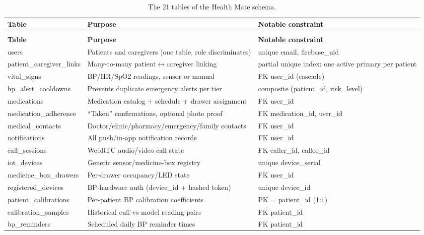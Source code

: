\documentclass[12pt,a4paper]{report}
\begin{document}
\begin{longtable}{@{}>{\raggedright\arraybackslash}p{3.4cm}>{\raggedright\arraybackslash}p{7.0cm}>{\raggedright\arraybackslash}p{4.3cm}@{}}
\caption{The 21 tables of the Health Mate schema.}\label{tab:tables}\\
\toprule
\textbf{Table} & \textbf{Purpose} & \textbf{Notable constraint} \\
\midrule
\endfirsthead
\multicolumn{3}{c}{\small\itshape Table~\ref{tab:tables} continued}\\
\toprule
\textbf{Table} & \textbf{Purpose} & \textbf{Notable constraint} \\
\midrule
\endhead
\bottomrule
\endfoot
users & Patients and caregivers (one table, role discriminates) & unique email, firebase\_uid \\
patient\_caregiver\_links & Many-to-many patient$\leftrightarrow$caregiver linking & partial unique index: one active primary per patient \\
vital\_signs & BP/HR/SpO2 readings, sensor or manual & FK user\_id (cascade) \\
bp\_alert\_cooldowns & Prevents duplicate emergency alerts per tier & composite (patient\_id, risk\_level) \\
medications & Medication catalog + schedule + drawer assignment & FK user\_id \\
medication\_adherence & ``Taken'' confirmations, optional photo proof & FK medication\_id, user\_id \\
medical\_contacts & Doctor/clinic/pharmacy/emergency/family contacts & FK user\_id \\
notifications & All push/in-app notification records & FK user\_id \\
call\_sessions & WebRTC audio/video call state & FK caller\_id, callee\_id \\
iot\_devices & Generic sensor/medicine-box registry & unique device\_serial \\
medicine\_box\_drawers & Per-drawer occupancy/LED state & FK user\_id \\
registered\_devices & BP-hardware auth (device\_id + hashed token) & unique device\_id \\
patient\_calibrations & Per-patient BP calibration coefficients & PK = patient\_id (1:1) \\
calibration\_samples & Historical cuff-vs-model reading pairs & FK patient\_id \\
bp\_reminders & Scheduled daily BP reminder times & FK patient\_id \\

\end{longtable}
\end{document}
